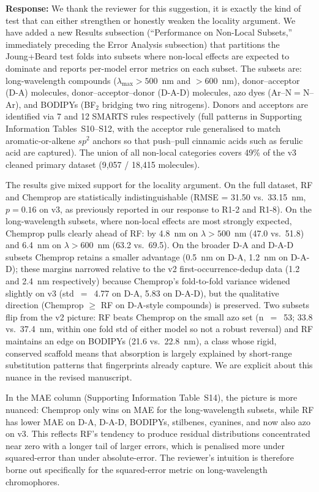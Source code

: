 \documentclass[11pt]{article}
\newcommand{\response}[1]{\noindent\textbf{Response:} #1\par\medskip}
\begin{document}
\response{We thank the reviewer for this suggestion, it is exactly the kind of test that can either strengthen or honestly weaken the locality argument. We have added a new Results subsection (``Performance on Non-Local Subsets,'' immediately preceding the Error Analysis subsection) that partitions the Joung+Beard test folds into subsets where non-local effects are expected to dominate and reports per-model error metrics on each subset. The subsets are: long-wavelength compounds ($\lambda_{\max} > 500$~nm and $> 600$~nm), donor--acceptor (D-A) molecules, donor--acceptor--donor (D-A-D) molecules, azo dyes (Ar--N$=$N--Ar), and BODIPYs (BF$_2$ bridging two ring nitrogens). Donors and acceptors are identified via 7 and 12 SMARTS rules respectively (full patterns in Supporting Information Tables~S10--S12, with the acceptor rule generalised to match aromatic-or-alkene $sp^2$ anchors so that push--pull cinnamic acids such as ferulic acid are captured). The union of all non-local categories covers 49\% of the v3 cleaned primary dataset (9{,}057 / 18{,}415 molecules).

The results give mixed support for the locality argument. On the full dataset, RF and Chemprop are statistically indistinguishable (RMSE = 31.50 vs.\ 33.15~nm, $p = 0.16$ on v3, as previously reported in our response to R1-2 and R1-8). On the long-wavelength subsets, where non-local effects are most strongly expected, Chemprop pulls clearly ahead of RF: by 4.8~nm on $\lambda > 500$~nm (47.0 vs.\ 51.8) and 6.4~nm on $\lambda > 600$~nm (63.2 vs.\ 69.5). On the broader D-A and D-A-D subsets Chemprop retains a smaller advantage (0.5~nm on D-A, 1.2~nm on D-A-D); these margins narrowed relative to the v2 first-occurrence-dedup data (1.2 and 2.4~nm respectively) because Chemprop's fold-to-fold variance widened slightly on v3 (std~$=$~4.77 on D-A, 5.83 on D-A-D), but the qualitative direction (Chemprop $\geq$ RF on D-A-style compounds) is preserved. Two subsets flip from the v2 picture: RF beats Chemprop on the small azo set (n~$=$~53; 33.8 vs.\ 37.4~nm, within one fold std of either model so not a robust reversal) and RF maintains an edge on BODIPYs (21.6 vs.\ 22.8~nm), a class whose rigid, conserved scaffold means that absorption is largely explained by short-range substitution patterns that fingerprints already capture. We are explicit about this nuance in the revised manuscript.

In the MAE column (Supporting Information Table~S14), the picture is more nuanced: Chemprop only wins on MAE for the long-wavelength subsets, while RF has lower MAE on D-A, D-A-D, BODIPYs, stilbenes, cyanines, and now also azo on v3. This reflects RF's tendency to produce residual distributions concentrated near zero with a longer tail of larger errors, which is penalised more under squared-error than under absolute-error. The reviewer's intuition is therefore borne out specifically for the squared-error metric on long-wavelength chromophores.

}
\end{document}
